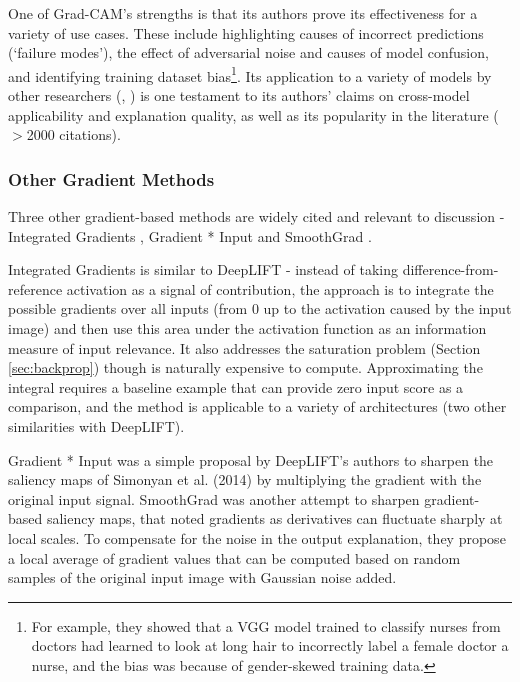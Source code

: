 \documentclass[main]{subfiles}
\begin{document}
One of Grad-CAM's strengths is that its authors prove its effectiveness for a variety of use cases. These include highlighting causes of incorrect predictions (`failure modes'), the effect of adversarial noise and causes of model confusion, and identifying training dataset bias\footnote{For example, they showed that a VGG model trained to classify nurses from doctors had learned to look at long hair to incorrectly label a female doctor a nurse, and the bias was because of gender-skewed training data.}. Its application to a variety of models by other researchers (\cite{gradcamplusplus}, \cite{xray}) is one testament to its authors' claims on cross-model applicability and explanation quality, as well as its popularity in the literature ($>$2000 citations). 



\subsubsection{Other Gradient Methods}

Three other gradient-based methods are widely cited and relevant to discussion - Integrated Gradients \cite{integrated}, Gradient * Input \cite{olddeeplift} and SmoothGrad \cite{smoothgrad}. 

Integrated Gradients is similar to DeepLIFT - instead of taking difference-from-reference activation as a signal of contribution, the approach is to integrate the possible gradients over all inputs (from 0 up to the activation caused by the input image) and then use this area under the activation function as an information measure of input relevance. It also addresses the saturation problem (Section \ref{sec:backprop}) though is naturally expensive to compute. Approximating the integral requires a baseline example that can provide zero input score as a comparison, and the method is applicable to a variety of architectures (two other similarities with DeepLIFT).

Gradient * Input was a simple proposal by DeepLIFT's authors to sharpen the saliency maps of Simonyan et al. (2014) \cite{saliencyII} by multiplying the gradient with the original input signal. SmoothGrad was another attempt to sharpen gradient-based saliency maps, that noted gradients as derivatives can fluctuate sharply at local scales. To compensate for the noise in the output explanation, they propose a local average of gradient values that can be computed based on random samples of the original input image with Gaussian noise added.
\end{document}
